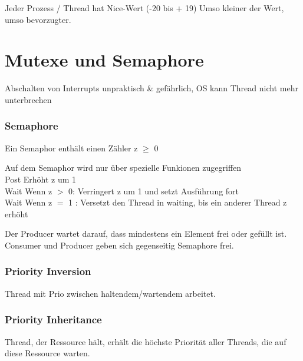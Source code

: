 \begin{multicols*}{5}
	\vspace{-10pt}
	Jeder Prozess / Thread hat Nice-Wert (-20 bis + 19) Umso kleiner der Wert, umso bevorzugter.

	

	
\vspace{-5pt}



\section{Mutexe und Semaphore}

\textcolor{h}{Abschalten von Interrupts} unpraktisch \& gefährlich, OS kann Thread nicht mehr unterbrechen


\subsubsection{Semaphore}

\begin{compactitem}[$\bullet$]
	\item Ein Semaphor enthält einen Zähler z $\geq$ 0
	\item Auf dem Semaphor wird nur über spezielle Funkionen zugegriffen\\
	\textcolor{h}{Post} Erhöht z um 1\\
	\textcolor{h}{Wait} Wenn z $>$ 0: Verringert z um 1 und setzt Ausführung fort\\
	\textcolor{h}{Wait} Wenn z $=$ 1 : Versetzt den Thread in waiting, bis ein anderer Thread z erhöht
\end{compactitem}
Der \textcolor{h}{Producer wartet} darauf, dass mindestens ein Element frei oder gefüllt ist. 
Consumer und Producer geben sich gegenseitig Semaphore frei.


\subsubsection{Priority Inversion}
Thread mit Prio zwischen haltendem/wartendem arbeitet.

\subsubsection{Priority Inheritance}
Thread, der Ressource hält, erhält die höchste Priorität aller Threads, die auf diese Ressource warten.



\end{multicols*}
